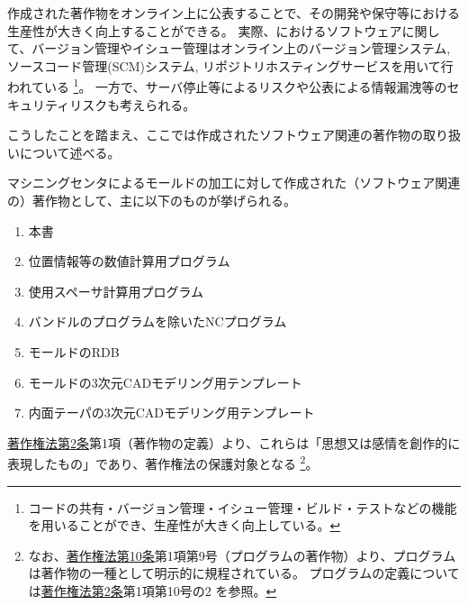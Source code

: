 

作成された著作物をオンライン上に公表することで、その開発や保守等における生産性が大きく向上することができる。
実際、\DMname におけるソフトウェアに関して、バージョン管理やイシュー管理はオンライン上のバージョン管理システム, ソースコード管理(SCM)システム, リポジトリホスティングサービスを用いて行われている
\footnote{コードの共有・バージョン管理・イシュー管理・ビルド・テストなどの機能を用いることができ、生産性が大きく向上している。}。
一方で、サーバ停止等によるリスクや公表による情報漏洩等のセキュリティリスクも考えられる。

こうしたことを踏まえ、ここでは作成されたソフトウェア関連の著作物の取り扱いについて述べる。



マシニングセンタによるモールドの加工に対して作成された（ソフトウェア関連の）著作物として、主に以下のものが挙げられる。
\begin{enumerate}
\item 本書
\item 位置情報等の数値計算用プログラム
\item 使用スペーサ計算用プログラム
\item バンドルのプログラムを除いたNCプログラム
\item モールドのRDB
\item モールドの3次元CADモデリング用テンプレート
\item 内面テーパの3次元CADモデリング用テンプレート
\end{enumerate}
\href{https://elaws.e-gov.go.jp/document?lawid=345AC0000000048#Mp-At_2}{著作権法第2条}第1項（著作物の定義）\cite{eGovCopyrightLaw}より、これらは「思想又は感情を創作的に表現したもの」であり、著作権法の保護対象となる
\footnote{なお、\href{https://elaws.e-gov.go.jp/document?lawid=345AC0000000048\#Mp-At_10}{著作権法第10条}第1項第9号（プログラムの著作物）\cite{eGovCopyrightLaw}より、プログラムは著作物の一種として明示的に規程されている。
プログラムの定義については\href{https://elaws.e-gov.go.jp/document?lawid=345AC0000000048\#Mp-At_2}{著作権法第2条}第1項第10号の2 \cite{eGovCopyrightLaw}を参照。}。



